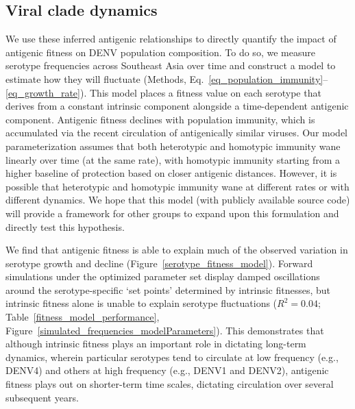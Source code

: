 \documentclass[11pt,oneside,letterpaper]{article}
\begin{document}
\subsection*{Viral clade dynamics}
We use these inferred antigenic relationships to directly quantify the impact of antigenic fitness on DENV population composition.
To do so, we measure serotype frequencies across Southeast Asia over time and construct a model to estimate how they will fluctuate (Methods, Eq.~\ref{eq_population_immunity}--\ref{eq_growth_rate}).
This model places a fitness value on each serotype that derives from a constant intrinsic component alongside a time-dependent antigenic component.
Antigenic fitness declines with population immunity, which is accumulated via the recent circulation of antigenically similar viruses.
Our model parameterization assumes that both heterotypic and homotypic immunity wane linearly over time (at the same rate), with homotypic immunity starting from a higher baseline of protection based on closer antigenic distances.
However, it is possible that heterotypic and homotypic immunity wane at different rates or with different dynamics.
We hope that this model (with publicly available source code) will provide a framework for other groups to expand upon this formulation and directly test this hypothesis.

We find that antigenic fitness is able to explain much of the observed variation in serotype growth and decline (Figure~\ref{serotype_fitness_model}).
Forward simulations under the optimized parameter set display damped oscillations around the serotype-specific `set points' determined by intrinsic fitnesses, but intrinsic fitness alone is unable to explain serotype fluctuations ($R^2=0.04$; Table~\ref{fitness_model_performance}, Figure~\ref{simulated_frequencies_modelParameters}).
This demonstrates that although intrinsic fitness plays an important role in dictating long-term dynamics, wherein particular serotypes tend to circulate at low frequency (e.g., DENV4) and others at high frequency (e.g., DENV1 and DENV2),  antigenic fitness plays out on shorter-term time scales, dictating circulation over several subsequent years.
\end{document}
